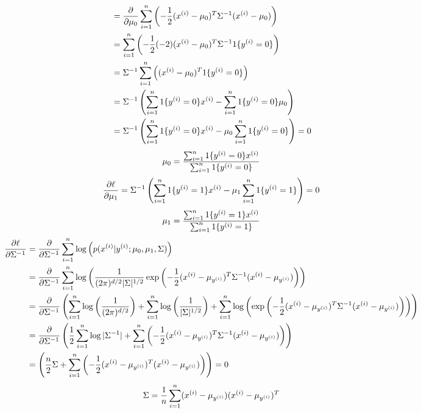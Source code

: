 \begin{answer}
\begin{align*}
&=\frac{\partial}{\partial\mu_{0}}\sum_{i=1}^{n} \left(-\frac{1}{2}(x^{(i)}-\mu_{0})^T \Sigma^{-1} (x^{(i)}-\mu_{0})\right) \\
&=\sum_{i=1}^{n} \left(-\frac{1}{2}(-2)(x^{(i)}-\mu_{0})^T \Sigma^{-1}1\{y^{(i)} = 0\}\right) \\
&=\Sigma^{-1}\sum_{i=1}^{n} \left((x^{(i)}-\mu_{0})^T 1\{y^{(i)} = 0\}\right) \\
&=\Sigma^{-1}\left(\sum_{i=1}^{n}  1\{y^{(i)} = 0\}x^{(i)}-\sum_{i=1}^{n} 1\{y^{(i)} = 0\}\mu_{0}\right) \\
&=\Sigma^{-1}\left(\sum_{i=1}^{n} 1\{y^{(i)} = 0\}x^{(i)}-\mu_{0}\sum_{i=1}^{n} 1\{y^{(i)} = 0\}\right)=0
  \end{align*}
  \begin{align*}
\mu_0=\frac{\sum_{i=1}^{n} 1\{y^{(i)} = {0}\} x^{(i)}}{\sum_{i=1}^{n}1\{y^{(i)} = {0}\}}
  \end{align*}
  \begin{align*}
\frac{\partial\ell}{\partial\mu_{1}}=\Sigma^{-1}\left(\sum_{i=1}^{n} 1\{y^{(i)} = 1\}x^{(i)}-\mu_{1}\sum_{i=1}^{n} 1\{y^{(i)} = 1\}\right)=0
  \end{align*}
  \begin{align*}
\mu_1=\frac{\sum_{i=1}^{n} 1\{y^{(i)} = {1}\} x^{(i)}}{\sum_{i=1}^{n}1\{y^{(i)} = {1}\}}
  \end{align*}
  \begin{align*}
\frac{\partial\ell}{\partial\Sigma^{-1}}&=\frac{\partial}{\partial\Sigma^{-1}}\sum_{i=1}^{n} \log \left( p(x^{(i)} | y^{(i)}; \mu_{0}, \mu_1, \Sigma) \right)\\
&=\frac{\partial}{\partial\Sigma^{-1}}\sum_{i=1}^{n} \log \left(\frac{1}{(2\pi)^{{d}/2} |\Sigma|^{1/2}}\exp\left(-\frac{1}{2}(x^{(i)}-\mu_{y^{(i)}})^T \Sigma^{-1} (x^{(i)}-\mu_{y^{(i)}})\right) \right)\\
&=\frac{\partial}{\partial\Sigma^{-1}}\left(\sum_{i=1}^{n} \log \left(\frac{1}{(2\pi)^{{d}/2}}\right)+\sum_{i=1}^{n} \log \left(\frac{1}{|\Sigma|^{1/2}}\right)+\sum_{i=1}^{n} \log\left(\exp\left(-\frac{1}{2}(x^{(i)}-\mu_{y^{(i)}})^T \Sigma^{-1} (x^{(i)}-\mu_{y^{(i)}})\right) \right)\right)\\
&=\frac{\partial}{\partial\Sigma^{-1}}\left(\frac{1}{2}\sum_{i=1}^{n} \log|\Sigma^{-1}|+\sum_{i=1}^{n} \left(-\frac{1}{2}(x^{(i)}-\mu_{y^{(i)}})^T \Sigma^{-1} (x^{(i)}-\mu_{y^{(i)}})\right)\right)\\
&=\left(\frac{{n}}{2}\Sigma+\sum_{i=1}^{n} \left(-\frac{1}{2}(x^{(i)}-\mu_{y^{(i)}})^T(x^{(i)}-\mu_{y^{(i)}})\right)\right)=0
  \end{align*}
  \begin{align*}
\Sigma=\frac{1}{{n}} \sum_{i=1}^{n} (x^{(i)} - \mu_{y^{(i)}}) (x^{(i)} -\mu_{y^{(i)}})^T
  \end{align*}
\end{answer}
